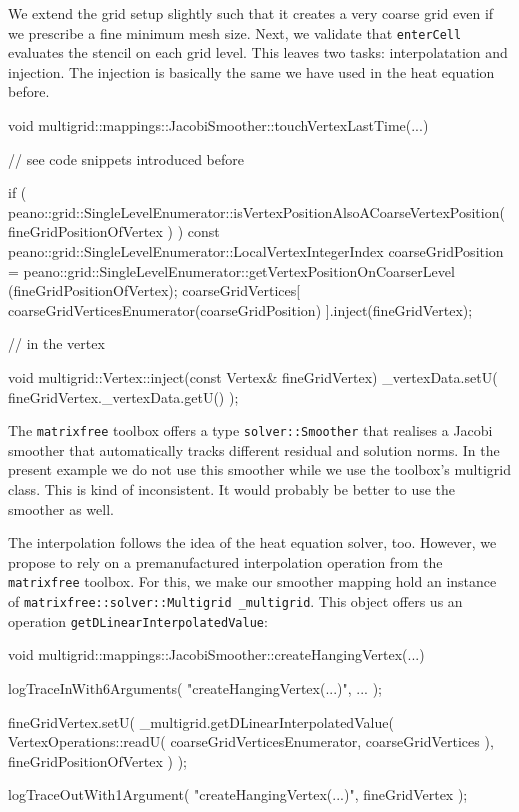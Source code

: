 We extend the grid setup slightly such that it creates a very coarse grid even
if we prescribe a fine minimum mesh size.
Next, we validate that \texttt{enterCell} evaluates the stencil on each grid
level.
This leaves two tasks: interpolatation and injection.
The injection is basically the same we have used in the heat equation before.
\begin{code}
void multigrid::mappings::JacobiSmoother::touchVertexLastTime(...) {
 // see code snippets introduced before

 if (
  peano::grid::SingleLevelEnumerator::isVertexPositionAlsoACoarseVertexPosition(
    fineGridPositionOfVertex
  )
 ) {
  const peano::grid::SingleLevelEnumerator::LocalVertexIntegerIndex coarseGridPosition =
    peano::grid::SingleLevelEnumerator::getVertexPositionOnCoarserLevel
    (fineGridPositionOfVertex);
  coarseGridVertices[ coarseGridVerticesEnumerator(coarseGridPosition) ].inject(fineGridVertex);
 }
}


// in the vertex

void multigrid::Vertex::inject(const Vertex& fineGridVertex) {
  _vertexData.setU( fineGridVertex._vertexData.getU() );
}
\end{code}



\begin{remark}
  The \texttt{matrixfree} toolbox offers a type \texttt{solver::Smoother} that
  realises a Jacobi smoother that automatically tracks different residual and
  solution norms. In the present example we do not use this smoother while we
  use the toolbox's multigrid class. This is kind of inconsistent. It would
  probably be better to use the smoother as well.
\end{remark}

\noindent
The interpolation follows the idea of the heat equation solver, too.
However, we propose to rely on a premanufactured interpolation operation from
the \texttt{matrixfree} toolbox.
For this, we make our smoother mapping hold an instance of
\texttt{matrixfree::solver::Multigrid  \_multigrid}.
This object offers us an operation \texttt{getDLinearInterpolatedValue}: 

\begin{code}
void multigrid::mappings::JacobiSmoother::createHangingVertex(...) {
  logTraceInWith6Arguments( "createHangingVertex(...)", ... );

  fineGridVertex.setU(
    _multigrid.getDLinearInterpolatedValue(
      VertexOperations::readU( coarseGridVerticesEnumerator, coarseGridVertices ),
      fineGridPositionOfVertex
    )
  );

  logTraceOutWith1Argument( "createHangingVertex(...)", fineGridVertex );
}
\end{code}


